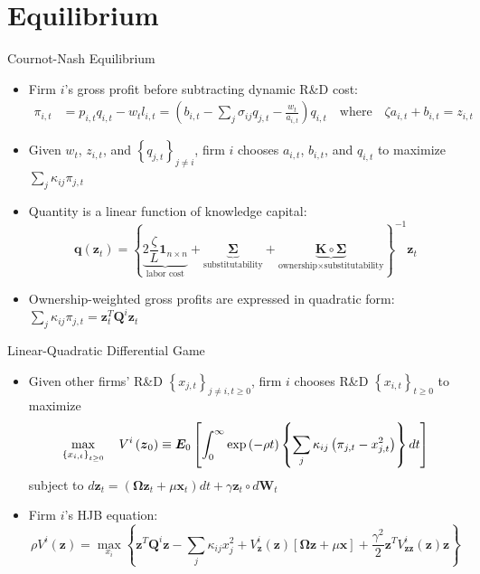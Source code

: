 \documentclass[
  10pt,               %
  aspectratio=169,    %
]{beamer}
\theoremstyle{plain}
\begin{document}
\section{Equilibrium}

\begin{frame}{Cournot-Nash Equilibrium}
  \label{cournot}
  \begin{itemize}
    \item Firm $i$'s gross profit before subtracting dynamic
          R\&D cost: \hyperlink{diagram}{}
          \begin{align*}
            \pi_{i,t} & =p_{i,t}q_{i,t}-w_{t}l_{i,t}=\left(b_{i,t}-\sum_{j}\sigma_{ij}q_{j,t}-\frac{w_{t}}{a_{i,t}}\right)q_{i,t}\quad\text{where}\quad\zeta a_{i,t}+b_{i,t}=z_{i,t}
          \end{align*}
    \item Given $w_{t}$, $z_{i,t}$, and $\left\{ q_{j,t}\right\} _{j\neq i}$,
          firm $i$ chooses $a_{i,t}$, $b_{i,t}$, and $q_{i,t}$ to maximize
          $\sum_{j}\kappa_{ij}\pi_{j,t}$\pause\medskip{}
    \item Quantity is a linear function of knowledge capital:
          \[
            \bm{q}(\bm{z}_{t})=\left\{ \underbrace{2\frac{\zeta}{L}\bm{1}_{n \times n}}_{\text{labor cost}}+\underbrace{\bm{\Sigma}}_{\text{substitutability}}+\underbrace{\bm{K}\circ\bm{\Sigma}}_{\text{ownership}\times\text{substitutability}}\right\} ^{-1}\bm{z}_{t}
          \]
    \item Ownership-weighted gross profits are expressed in quadratic form:
          $\sum_{j}\kappa_{ij}\pi_{j,t}=\bm{z}_{t}^{T}\bm{Q}^{i}\bm{z}_{t}$
          \hyperlink{Q}{}
  \end{itemize}
\end{frame}
%
\begin{frame}{Linear-Quadratic Differential Game}

  \begin{itemize}
    \item Given other firms' R\&D $\left\{ x_{j,t}\right\} _{j\neq i,t\geq0}$,
          firm $i$ chooses R\&D $\left\{ x_{i,t}\right\} _{t\geq0}$
          to maximize
          \[
            \max_{\left\{ x_{i,t}\right\} _{t\geq0}}\quad V^{i}\left(\text{\ensuremath{\bm{z}}}_{0}\right)\equiv\bm{E}_{0}\left[\int_{0}^{\infty}\exp\left(-\rho t\right)\left\{ \sum_{j}\kappa_{ij}\left(\pi_{j,t}-x_{j,t}^{2}\right)\right\} dt\right]
          \]
          subject to $d\bm{z}_{t}=\left(\bm{\Omega}\bm{z}_{t}+\mu\bm{x}_{t}\right)dt+\gamma\bm{z}_{t} \circ d\bm{W}_{t}$\pause\medskip{}
    \item Firm $i$'s HJB equation:
          \[
            \rho V^{i}\left(\bm{z}\right)=\max_{x_{i}}\left\{ \bm{z}^{T}\bm{Q}^{i}\bm{z}-\sum_{j}\kappa_{ij}x_{j}^{2}+V_{\bm{z}}^{i}\left(\bm{z}\right)\left[\bm{\Omega}\bm{z}+\mu\bm{x}\right]+\frac{\gamma^{2}}{2}\bm{z}^{T}V_{\bm{zz}}^{i}\left(\bm{z}\right)\bm{z}\right\}
          \]
  \end{itemize}
\end{frame}
\end{document}
